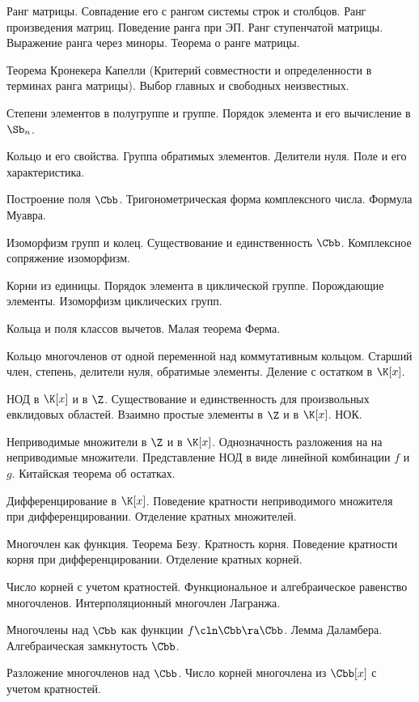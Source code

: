 \documentclass[a4paper]{article}
\begin{document}
\begin{nums}{0}
\item Ранг матрицы. Совпадение его с рангом системы строк и столбцов. Ранг произведения матриц. Поведение ранга
при ЭП. Ранг ступенчатой матрицы.
Выражение ранга через миноры. Теорема о ранге матрицы.
\item Теорема Кронекера Капелли (Критерий совместности и определенности в терминах ранга матрицы). Выбор
главных и свободных неизвестных.
\item Степени элементов в полугруппе и группе. Порядок элемента и его вычисление в $\Sb_n$.
\item Кольцо и его свойства. Группа обратимых элементов. Делители нуля. Поле и его характеристика.
\item Построение поля $\Cbb$. Тригонометрическая форма комплексного числа. Формула Муавра.
\item Изоморфизм групп и колец. Существование и единственность $\Cbb$. Комплексное сопряжение изоморфизм.
\item Корни из единицы. Порядок элемента в циклической группе. Порождающие элементы. Изоморфизм циклических групп.
\item Кольца и поля классов вычетов. Малая теорема Ферма.
\item Кольцо многочленов от одной переменной над коммутативным кольцом. Старший член, степень, делители нуля,
обратимые элементы. Деление с остатком в $\K[x]$.
\item НОД в $\K[x]$ и в $\Z$. Существование и единственность для произвольных евклидовых областей. Взаимно
простые элементы в $\Z$ и в $\K[x]$. НОК.
\item Неприводимые множители в $\Z$ и в $\K[x]$. Однозначность разложения на на неприводимые множители.
Представление НОД в виде линейной комбинации $f$ и $g$. Китайская теорема об остатках.
\item Дифференцирование в $\K[x]$. Поведение кратности неприводимого множителя при дифференцировании.
Отделение кратных множителей.
\item Многочлен как функция. Теорема Безу. Кратность корня. Поведение кратности корня при дифференцировании.
Отделение кратных корней.
\item Число корней с учетом кратностей. Функциональное и алгебраическое равенство многочленов.
Интерполяционный многочлен Лагранжа.
\item Многочлены над $\Cbb$ как функции $f\cln \Cbb \ra \Cbb$. Лемма Даламбера. Алгебраическая замкнутость $\Cbb$.
\item Разложение многочленов над $\Cbb$. Число корней многочлена из $\Cbb[x]$ с учетом кратностей.

\end{nums}
\end{document}
